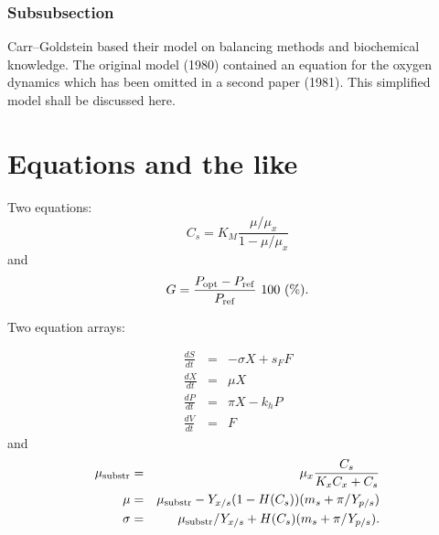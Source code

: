 \documentclass[ba]{imsart}
\numberwithin{equation}{section}
\theoremstyle{plain}
\begin{document}
\subsubsection{Subsubsection}

Carr--Goldstein based their model on balancing methods and biochemical
know\-ledge. The original model (1980) contained an equation for the
oxygen dynamics which has been omitted in a second paper (1981). This
simplified model shall be discussed here.

\section{Equations and the like}

Two equations:
\begin{equation}
    C_{s}  =  K_{M} \frac{\mu/\mu_{x}}{1-\mu/\mu_{x}} \label{ccs}
\end{equation}
and
\begin{equation}
    G = \frac{P_{\rm opt} - P_{\rm ref}}{P_{\rm ref}} \mbox{\ }100 \mbox{\ }(\%).
\end{equation}

Two equation arrays:

\begin{eqnarray}
  \frac{dS}{dt} & = & - \sigma X + s_{F} F\\
  \frac{dX}{dt} & = &   \mu    X\\
  \frac{dP}{dt} & = &   \pi    X - k_{h} P\\
  \frac{dV}{dt} & = &   F
\end{eqnarray}
and
\begin{eqnarray}
 \mu_{\rm substr} & = & \mu_{x} \frac{C_{s}}{K_{x}C_{x}+C_{s}}  \\
 \mu              & = & \mu_{\rm substr} - Y_{x/s}(1-H(C_{s}))(m_{s}+\pi /Y_{p/s}) \\
 \sigma           & = & \mu_{\rm substr}/Y_{x/s}+ H(C_{s}) (m_{s}+ \pi /Y_{p/s}).
\end{eqnarray}


\begin{supplement}
\end{supplement}
\begin{supplement}
\end{supplement}
\end{document}
